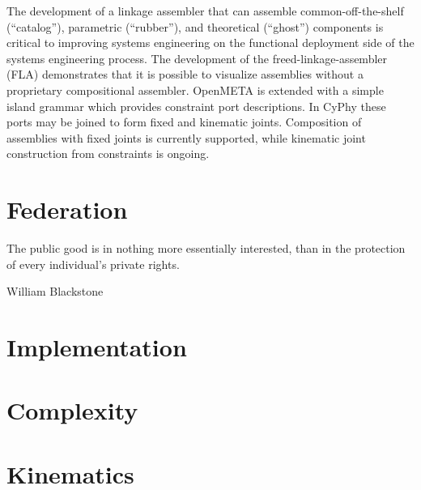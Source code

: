 \documentclass[]{report}
\begin{document}
The development of a linkage assembler that can assemble 
common-off-the-shelf  (“catalog”), parametric (“rubber”), and 
theoretical (“ghost”) components is critical to improving systems engineering 
on the functional deployment side of the systems engineering process. 
The development of the freed-linkage-assembler (FLA) demonstrates that it is 
possible to visualize assemblies without a proprietary compositional assembler. 
OpenMETA is extended with a simple island grammar which provides constraint port descriptions.  
In CyPhy these ports may be joined to form fixed and kinematic joints. 
Composition of assemblies with fixed joints is currently supported, while kinematic joint construction from constraints is ongoing.

\chapter{Federation}

\epigraph{The public good is in nothing more essentially interested, 
than in the protection of every individual's private rights.}{William Blackstone}



\chapter{Implementation}


\chapter{Complexity}


\chapter{Kinematics}


	
	
	
	
\end{document}
